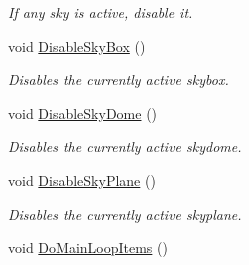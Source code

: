 \begin{DoxyCompactItemize}
\begin{DoxyCompactList}\small\item\em If any sky is active, disable it. \item\end{DoxyCompactList}\item 
void \hyperlink{classMezzanine_1_1SceneManager_afda2cf0379dbfb7ca1f53950c489cdae}{DisableSkyBox} ()
\begin{DoxyCompactList}\small\item\em Disables the currently active skybox. \item\end{DoxyCompactList}\item 
void \hyperlink{classMezzanine_1_1SceneManager_a505c371bfe64cd5a07cecd6ece4c8ed8}{DisableSkyDome} ()
\begin{DoxyCompactList}\small\item\em Disables the currently active skydome. \item\end{DoxyCompactList}\item 
void \hyperlink{classMezzanine_1_1SceneManager_ac60ecdd9745803cf7d99af3a87fa6a36}{DisableSkyPlane} ()
\begin{DoxyCompactList}\small\item\em Disables the currently active skyplane. \item\end{DoxyCompactList}\item 
\hypertarget{classMezzanine_1_1SceneManager_ae75aa9deb4bbc8ee1f979e240070309f}{
void \hyperlink{classMezzanine_1_1SceneManager_ae75aa9deb4bbc8ee1f979e240070309f}{DoMainLoopItems} ()}
\label{classMezzanine_1_1SceneManager_ae75aa9deb4bbc8ee1f979e240070309f}


\end{DoxyCompactItemize}
